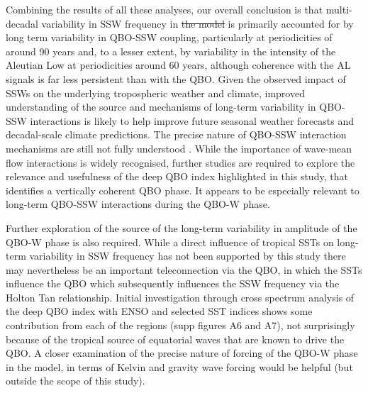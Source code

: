 \documentclass[wcd, manuscript]{copernicus}
\providecommand{\DIFadd}[1]{{\protect\color{blue}\uwave{#1}}} %
\providecommand{\DIFdel}[1]{{\protect\color{red}\sout{#1}}}                      %
\providecommand{\DIFaddbegin}{} %
\providecommand{\DIFaddend}{} %
\providecommand{\DIFdelbegin}{} %
\providecommand{\DIFdelend}{} %
\begin{document}
Combining the results of all these analyses, our overall  conclusion is that multi-decadal variability in SSW frequency in \DIFdelbegin \DIFdel{the model }\DIFdelend \DIFaddbegin \DIFadd{UKESM }\DIFaddend is primarily accounted for by long term variability in QBO-SSW coupling, particularly at periodicities of around 90 years and, to a lesser extent, by variability in the intensity of the Aleutian Low at periodicities around 60 years, although coherence with the AL signals is far less persistent than with the QBO. Given the observed impact of SSWs on the underlying tropospheric weather and climate, improved understanding of the source and mechanisms of long-term variability in QBO-SSW interactions is likely to help improve future seasonal weather forecasts and decadal-scale climate predictions. The precise nature of QBO-SSW interaction mechanisms are still not fully understood \citep{Anstey2014}. While the importance of wave-mean flow interactions is widely recognised, further studies are required to explore the relevance and usefulness of the deep QBO index highlighted in this study, that identifies a vertically coherent QBO phase. It appears to be especially relevant to long-term QBO-SSW interactions during the QBO-W phase. 

Further exploration of the source of the long-term variability in amplitude of the QBO-W phase is also required. While a direct influence of tropical SSTs on long-term variability in SSW frequency has not been supported by this study there may nevertheless be an important teleconnection via the QBO, in which the SSTs influence the QBO which subsequently influences the SSW frequency via the Holton Tan relationship. Initial investigation through cross spectrum analysis of the deep QBO index with ENSO and selected SST indices shows some contribution from each of the regions (supp figures A6 and A7), not surprisingly because of the tropical source of equatorial waves that are known to drive the QBO. A closer examination of the precise nature of forcing of the QBO-W phase in the model, in terms of Kelvin and gravity wave forcing would be helpful (but outside the scope of this study). 
\end{document}
